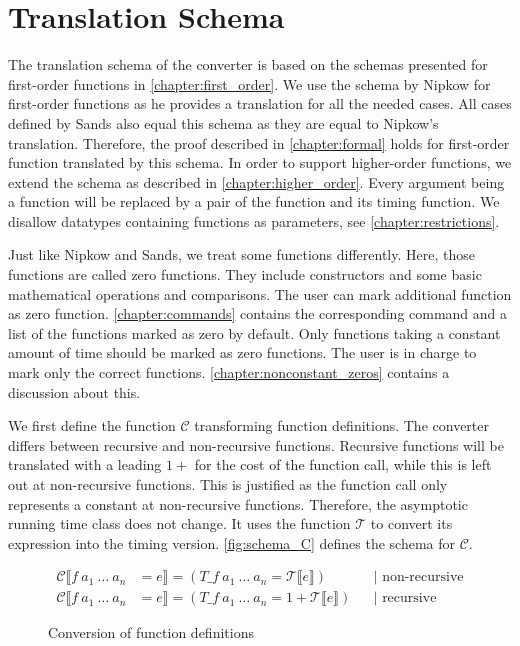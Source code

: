 
\section{Translation Schema} \label{chapter:impl_schema}

The translation schema of the converter is based on the schemas presented for first-order functions in \autoref{chapter:first_order}.
We use the schema by Nipkow \parencite{fds} for first-order functions as he provides a translation for all the needed cases.
All cases defined by Sands also equal this schema \parencite{sands} as they are equal to Nipkow's translation.
Therefore, the proof described in \autoref{chapter:formal} holds for first-order function translated by this schema.
In order to support higher-order functions, we extend the schema as described in \autoref{chapter:higher_order}.
Every argument being a function will be replaced by a pair of the function and its timing function.
We disallow datatypes containing functions as parameters, see \autoref{chapter:restrictions}.

Just like Nipkow and Sands, we treat some functions differently.
Here, those functions are called zero functions.
They include constructors and some basic mathematical operations and comparisons.
The user can mark additional function as zero function.
\autoref{chapter:commands} contains the corresponding command and a list of the functions marked as zero by default.
Only functions taking a constant amount of time should be marked as zero functions.
The user is in charge to mark only the correct functions.
\autoref{chapter:nonconstant_zeros} contains a discussion about this.

We first define the function $\mathcal{C}$ transforming function definitions.
The converter differs between recursive and non-recursive functions.
Recursive functions will be translated with a leading $1+$ for the cost of the function call, while this is left out at non-recursive functions.
This is justified as the function call only represents a constant at non-recursive functions.
Therefore, the asymptotic running time class does not change.
It uses the function $\mathcal{T}$ to convert its expression into the timing version.
\autoref{fig:schema_C} defines the schema for $\mathcal{C}$.
\begin{figure}
  \begin{align*}
    \mathcal{C}\llbracket f\ a_1\ \dots\ a_n &= e\rrbracket = (T\_f\ a_{1}\ \dots\ a_{n} = \mathcal{T}\llbracket e\rrbracket) &&\text{| non-recursive}\\
    \mathcal{C}\llbracket f\ a_1\ \dots\ a_n &= e\rrbracket = (T\_f\ a_{1}\ \dots\ a_{n} = 1 + \mathcal{T}\llbracket e\rrbracket) &&\text{| recursive}
  \end{align*}
  \caption{Conversion of function definitions}
  \label{fig:schema_C}
\end{figure}

